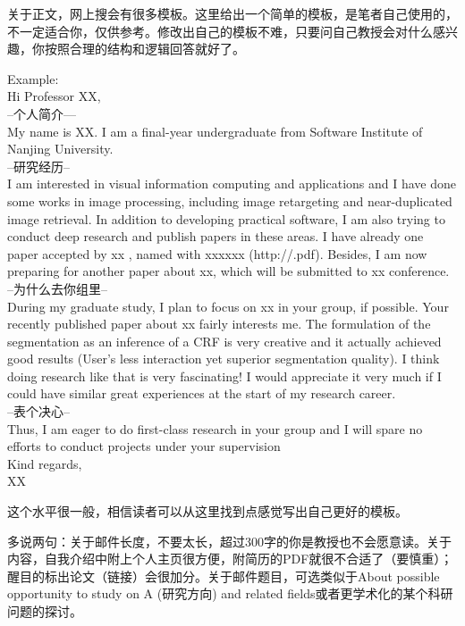 关于正文，网上搜会有很多模板。这里给出一个简单的模板，是笔者自己使用的，不一定适合你，仅供参考。修改出自己的模板不难，只要问自己教授会对什么感兴趣，你按照合理的结构和逻辑回答就好了。\par
\hspace{-3ex}Example:\\
Hi Professor XX,\\
--个人简介—\\
My name is XX. I am a final-year undergraduate from Software Institute of Nanjing University.\\
--研究经历--\\
I am interested in visual information computing and applications and I have done some works in image processing, including image retargeting and near-duplicated image retrieval. In addition to developing practical software, I am also trying to conduct deep research and publish papers in these areas. I have already one paper accepted by xx , named with xxxxxx (http://.pdf). Besides, I am now preparing for another paper about xx, which will be submitted to xx conference.\\
--为什么去你组里--\\
During my graduate study, I plan to focus on xx in your group, if possible. Your recently published paper about xx fairly interests me. The formulation of the segmentation as an inference of a CRF is very creative and it actually achieved good results (User’s less interaction yet superior segmentation quality). I think doing research like that is very fascinating! I would appreciate it very much if I could have similar great experiences at the start of my research career.\\
--表个决心--\\
Thus, I am eager to do first-class research in your group and I will spare no efforts to conduct projects under your supervision\\

\hspace{-3ex}Kind regards,\\
XX\par
这个水平很一般，相信读者可以从这里找到点感觉写出自己更好的模板。\par

多说两句：关于邮件长度，不要太长，超过300字的你是教授也不会愿意读。关于内容，自我介绍中附上个人主页很方便，附简历的PDF就很不合适了（要慎重）；醒目的标出论文（链接）会很加分。关于邮件题目，可选类似于About possible opportunity to study on A (研究方向) and related fields或者更学术化的某个科研问题的探讨。
